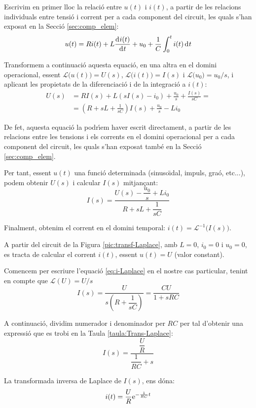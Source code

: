 Escrivim en primer lloc  la relaci\'{o} entre $u(t)$ i $i(t)$, a partir
de les relacions individuals entre tensi\'{o} i corrent per a cada
component del circuit, les quals s'han exposat en la Secci\'{o}
\vref{sec:comp_elem}:
\begin{equation}
    u(t) = R i(t) + L \frac{\diff i(t)}{\diff t} + u_0 + \frac{1}{C}
    \int_0^t i(t) \diff t
\end{equation}

Transformem a continuaci\'{o} aquesta equaci\'{o}, en una altra en el domini
operacional, essent $\mathcal{L}\bigl(u(t)\bigr) = U(s)$,
$\mathcal{L}\bigl(i(t)\bigr) = I(s)$ i $\mathcal{L}\bigl(u_0\bigr) =
u_0/s$, i aplicant les propietats de la diferenciaci\'{o} i de la
integraci\'{o} a $i(t)$:
\begin{equation}\begin{split}
    U(s) &= R I(s) + L(s I(s) -i_0) + \frac{u_0}{s} + \frac{I(s)}{s
    C} =\\[1ex]
    &= \left( R + s L +\frac{1}{s C}\right)I(s) + \frac{u_0}{s} - L i_0
\end{split}\end{equation}

De fet, aquesta equaci\'{o} la podr\'{\i}em haver escrit directament, a
partir de les relacions entre les tensions i els corrents en el
domini operacional per a cada  component del circuit, les quals
s'han exposat tamb\'{e} en la Secci\'{o} \vref{sec:comp_elem}.

Per tant, essent $u(t)$  una funci\'{o} determinada (sinuso\"{\i}dal, impuls,
gra\'{o}, etc...), podem obtenir $U(s)$ i calcular $I(s)$ mitjan\c{c}ant:
\begin{equation}
    I(s) = \frac{U(s)-\dfrac{u_0}{s} + L i_0}{R + s L
    +\dfrac{1}{s C}}\label{eq:i-Laplace}
\end{equation}

Finalment, obtenim el corrent en el domini temporal: $i(t) =
\mathcal{L}^{-1}\bigl(I(s)\bigr)$.

\begin{exemple}

A partir del circuit de la Figura \vref{pic:transf-Laplace}, amb
$L=0$, $i_0=0$ i $u_0=0$, es tracta de calcular el corrent $i(t)$,
essent $u(t)=U$ (valor constant).

Comencem per escriure l'equaci\'{o} \eqref{eq:i-Laplace} en el nostre
cas particular, tenint en compte que $\mathcal{L}(U) = U/s$
\[
    I(s) = \frac{U}{s\left(R + \dfrac{1}{s C}\right)} = \frac{C U}{1 + s R C}
\]

A continuaci\'{o}, dividim numerador i denominador per $R C$ per tal
d'obtenir una expressi\'{o} que es trobi en la Taula
\vref{taula:Trans-Laplace}:
\[
    I(s) = \frac{\dfrac{U}{R}}{\dfrac{1}{R C} + s}
\]

La transformada inversa de Laplace de $I(s)$, ens d\'{o}na:
\[
    i(t) = \frac{U}{R} \mathrm{e}^{-\frac{1}{R C}t}
\]

\end{exemple}

